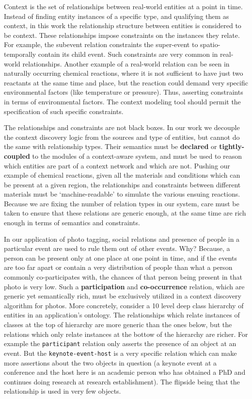 Context is the set of relationships between real-world entities at a point in time. Instead of finding entity instances of a specific type, and qualifying them as context, in this work the relationship structure between entities is considered to be  context. These relationships impose constraints on the instances they relate. For example, the subevent relation constraints the super-event to spatio-temporally contain its child event. Such constraints are very common in real-world relationships. Another example of a real-world relation can be seen in naturally occurring chemical reactions, where it is not sufficient to have just two reactants at the same time and place, but the reaction could demand very specific environmental factors (like temperature or pressure). Thus, asserting constraints in terms of environmental factors. The context modeling tool should permit the specification of such specific constraints.

The relationships and constraints are not black boxes. In our work we decouple the context discovery logic from the sources and type of entities, but cannot do the same with relationship types. Their semantics must be \textbf{declared} or \textbf{tightly-coupled} to the modules of a context-aware system, and must be used to reason which entities are part of a context network and which are not. Pushing our example of chemical reactions, given all the materials and conditions which can be present at a given region, the relationships and constraints between different materials must be `machine-readable' to simulate the various ensuing reactions. Because we are fixing the number of relation types in our system, care must be taken to ensure that these relations are generic enough, at the same time are rich enough in terms of semantics and constraints.

In our application of photo tagging, social relations and presence of people in a particular event are used to rule them out of other events. Why? Because, a person can be present only at one place at one point in time, and if the events are too far apart or contain a very distribution of people than what a person commonly co-participates with, the chances of that person being present in that photo is very low. Such a \textbf{participation} and \textbf{co-occurrence} relation, which are generic yet semantically rich, must be exclusively utilized in a context discovery algorithm for photos. More concretely, consider a 10 level deep class hierarchy of entities in an application's ontology. The relationships which relate instances of classes at the top of hierarchy are more generic than the ones below, but the relations which only relate instances at the bottow of the hierarchy are richer. For example the \texttt{participant} relation only asserts the presence of an object at an event. But the \texttt{keynote-event-host} is a very specific relation which can make more assertions about the two objects in question (a keynote event at a conference and the host here is an academic person who has obtained a PhD and continues doing research at research establishment). The flipside being that the relationship is used in very few objects.

